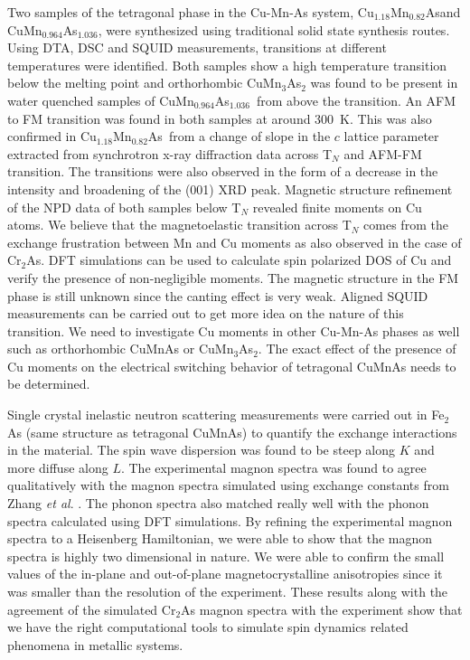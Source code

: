 \documentclass[10pt,doublespacing,edeposit]{uiucthesis2020}
\newcommand*{\cuexcess}{Cu$_{1.18}$Mn$_{0.82}$As}
\newcommand*{\asexcess}{CuMn$_{0.964}$As$_{1.036}$}
\begin{document}
\begin{mainmatter}
Two samples of the tetragonal phase in the Cu-Mn-As system, \cuexcess and \asexcess, were synthesized using traditional solid state synthesis routes. Using DTA, DSC and SQUID measurements, transitions at different temperatures were identified. Both samples show a high temperature transition below the melting point and orthorhombic CuMn$_3$As$_2$ was found to be present in water quenched samples of \asexcess\ from above the transition. An AFM to FM transition was found in both samples at around 300~K. This was also confirmed  in \cuexcess\ from a change of slope in the $c$ lattice parameter extracted from synchrotron x-ray diffraction data across T$_N$ and AFM-FM transition. The transitions were also observed in the form of a decrease in the intensity and broadening of the (001) XRD peak. Magnetic structure refinement of the NPD data of both samples below T$_N$ revealed finite moments on Cu atoms. We believe that the magnetoelastic transition across T$_N$ comes from the exchange frustration between Mn and Cu moments as also observed in the case of Cr$_2$As. DFT simulations can be used to calculate spin polarized DOS of Cu and verify the presence of non-negligible moments. The magnetic structure in the FM phase is still unknown since the canting effect is very weak. Aligned SQUID measurements can be carried out to get more idea on the nature of this transition. We need to investigate Cu moments in other Cu-Mn-As phases as well such as orthorhombic CuMnAs or CuMn$_3$As$_2$. The exact effect of the presence of Cu moments on the electrical switching behavior of tetragonal CuMnAs needs to be determined.


Single crystal inelastic neutron scattering measurements were carried out in Fe$_2$As (same structure as tetragonal CuMnAs) to quantify the exchange interactions in the material. The spin wave dispersion was found to be steep along $K$ and more diffuse along $L$. The experimental magnon spectra was found to agree qualitatively with the magnon spectra simulated using exchange constants from Zhang \emph{et al}. \cite{Zhang2013}. The phonon spectra also matched really well with the phonon spectra calculated using DFT simulations. By refining the experimental magnon spectra to a Heisenberg Hamiltonian, we were able to show that the magnon spectra is highly two dimensional in nature. We were able to confirm the small values of the in-plane and out-of-plane magnetocrystalline anisotropies since it was smaller than the resolution of the experiment. These results along with the agreement of the simulated Cr$_2$As magnon spectra with the experiment show that we have the right computational tools to simulate spin dynamics related phenomena in metallic systems.

\end{mainmatter}



\begin{backmatter}




\end{backmatter}



\end{document}
